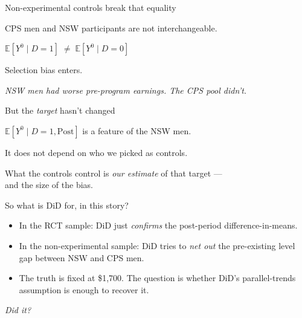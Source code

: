 \documentclass[11pt,aspectratio=169]{beamer}
\begin{document}
\begin{frame}{Non-experimental controls break that equality}
\vspace{1em}
\begin{center}
\large
CPS men and NSW participants are not interchangeable.
\end{center}
\vspace{0.6em}
\begin{center}
\large
$\mathbb{E}[Y^0 \mid D{=}1] \;\neq\; \mathbb{E}[Y^0 \mid D{=}0]$
\end{center}
\vspace{1em}
\begin{center}
\large
Selection bias enters.
\end{center}
\vspace{0.6em}
\begin{center}
\small\color{warmgray}\itshape
NSW men had worse pre-program earnings. \;The CPS pool didn't.
\end{center}
\end{frame}

\begin{frame}{But the \textit{target} hasn't changed}
\vspace{1.2em}
\begin{center}
\large
$\mathbb{E}[Y^0 \mid D{=}1, \text{Post}]$ is a feature of the NSW men.
\end{center}
\vspace{0.6em}
\begin{center}
\large
It does not depend on who we picked as controls.
\end{center}
\vspace{1em}
\begin{center}
\large
What the controls control is \textit{our estimate} of that target --- \\[0.2em] and the size of the bias.
\end{center}
\end{frame}

\begin{frame}{So what is DiD for, in this story?}
\vspace{0.6em}
\begin{itemize}
  \item In the RCT sample: DiD just \textit{confirms} the post-period difference-in-means.
  \item In the non-experimental sample: DiD tries to \textit{net out} the pre-existing level gap between NSW and CPS men.
  \item The truth is fixed at \$1{,}700. \;The question is whether DiD's parallel-trends assumption is enough to recover it.
\end{itemize}
\vspace{0.6em}
\begin{center}
\large\itshape\color{charcoal}
Did it?
\end{center}
\end{frame}
\end{document}
